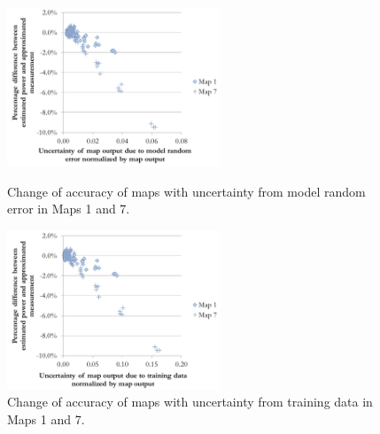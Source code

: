 \begin{figure}[h]
\begin{minipage}{15pc}
\includegraphics[width=15pc]{num_train_model.pdf}
\caption{\label{fig:num_train_model}Change of accuracy of maps with uncertainty from model random error in Maps 1 and 7.}
\end{minipage}\hspace{2pc}%
\begin{minipage}{15pc}
\includegraphics[width=15pc]{num_train_train.pdf}
\caption{\label{fig:num_train_train}Change of accuracy of maps with uncertainty from training data in Maps 1 and 7.}
\end{minipage} 
\end{figure}


